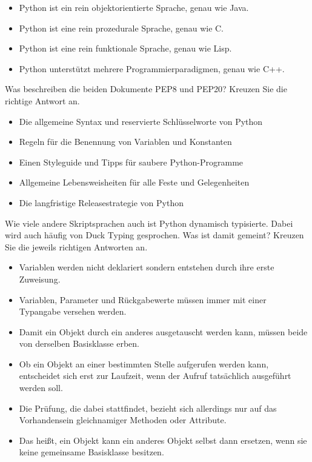 \begin{itemize}
    \renewcommand{\labelitemi}{$\square$}
    \item Python ist ein rein objektorientierte Sprache, genau wie Java.
    \item Python ist eine rein prozedurale Sprache, genau wie C.
    \item Python ist eine rein funktionale Sprache, genau wie Lisp.
    \item Python unterstützt mehrere Programmierparadigmen, genau wie C++.
\end{itemize}

\teilaufgabe
Was beschreiben die beiden Dokumente PEP8 und PEP20? Kreuzen Sie die richtige
Antwort an.

\begin{itemize}
    \renewcommand{\labelitemi}{$\square$}
    \item Die allgemeine Syntax und reservierte Schlüsselworte von Python
    \item Regeln für die Benennung von Variablen und Konstanten
    \item Einen Styleguide und Tipps für saubere Python-Programme
    \item Allgemeine Lebensweisheiten für alle Feste und Gelegenheiten
    \item Die langfristige Releasestrategie von Python
\end{itemize}

\teilaufgabe
Wie viele andere Skriptsprachen auch ist Python dynamisch typisierte. Dabei wird
auch häufig von \glqq{}Duck Typing\grqq{} gesprochen. Was ist damit gemeint?
Kreuzen Sie die jeweils richtigen Antworten an.

\begin{itemize}
    \renewcommand{\labelitemi}{$\square$}
    \item Variablen werden nicht deklariert sondern entstehen durch ihre erste Zuweisung.
    \item Variablen, Parameter und Rückgabewerte müssen immer mit einer Typangabe versehen werden.
    \item Damit ein Objekt durch ein anderes ausgetauscht werden kann, müssen beide von derselben Basisklasse erben.
    \item Ob ein Objekt an einer bestimmten Stelle aufgerufen werden kann, entscheidet sich erst zur Laufzeit,
    wenn der Aufruf tatsächlich ausgeführt werden soll.
    \item Die Prüfung, die dabei stattfindet, bezieht sich allerdings nur auf das Vorhandensein
    gleichnamiger Methoden oder Attribute.
    \item Das heißt, ein Objekt kann ein anderes Objekt selbst dann ersetzen,
    wenn sie keine gemeinsame Basisklasse besitzen.
\end{itemize}

